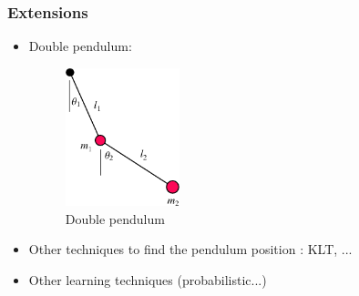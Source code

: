 \documentclass{beamer}
\begin{document}
\begin{frame}
\frametitle{Extensions}
\begin{itemize}
  \item Double pendulum:
    \begin{figure}
      \captionsetup{labelformat=empty}
      \includegraphics[height=4cm]{pendule_double.png}
      \caption{Double pendulum}
    \end{figure}
  \item Other techniques to find the pendulum position : KLT, ...
  \item Other learning techniques (probabilistic...)
\end{itemize}
\end{frame}
\end{document}
